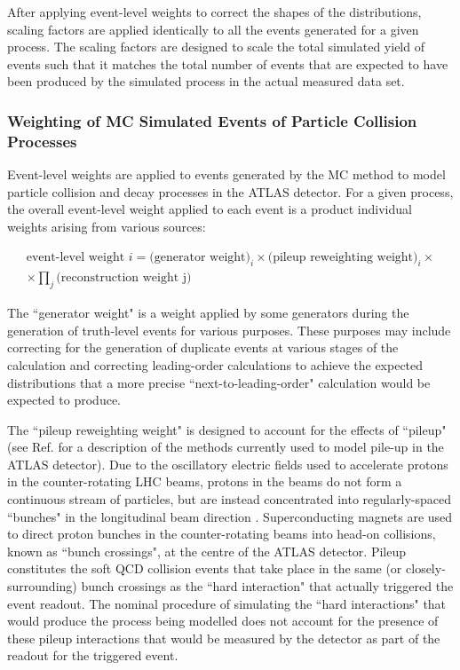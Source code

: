 After applying event-level weights to correct the shapes of the distributions, scaling factors are applied identically to all the events generated for a given process. The scaling factors are designed to scale the total simulated yield of events such that it matches the total number of events that are expected to have been produced by the simulated process in the actual measured data set. 


\subsubsection{Weighting of MC Simulated Events of Particle Collision Processes}
\label{sec:evt_wts}

Event-level weights are applied to events generated by the MC method to model particle collision and decay processes in the ATLAS detector. For a given process, the overall event-level weight applied to each event is a product individual weights arising from various sources:

\begin{multline}
\label{eq:evt_wt}
\text{event-level weight }i = \text{(generator weight)}_i \times \text{(pileup reweighting weight)}_i \times \\ \times \prod_j \text{(reconstruction weight j)}
\end{multline}

The ``generator weight" is a weight applied by some generators during the generation of truth-level events for various purposes. These purposes may include correcting for the generation of duplicate events at various stages of the calculation and correcting leading-order calculations to achieve the expected distributions that a more precise ``next-to-leading-order" calculation would be expected to produce. 

The ``pileup reweighting weight" is designed to account for the effects of ``pileup" (see Ref. \cite{pileup} for a description of the methods currently used to model pile-up in the ATLAS detector). Due to the oscillatory electric fields used to accelerate protons in the counter-rotating LHC beams, protons in the beams do not form a continuous stream of particles, but are instead concentrated into regularly-spaced ``bunches" in the longitudinal beam direction \cite{acc_physics_text}. Superconducting magnets are used to direct proton bunches in the counter-rotating beams into head-on collisions, known as ``bunch crossings", at the centre of the ATLAS detector. Pileup constitutes the soft QCD collision events that take place in the same (or closely-surrounding) bunch crossings as the ``hard interaction" that actually triggered the event readout. The nominal procedure of simulating the ``hard interactions" that would produce the process being modelled does not account for the presence of these pileup interactions that would be measured by the detector as part of the readout for the triggered event. 

